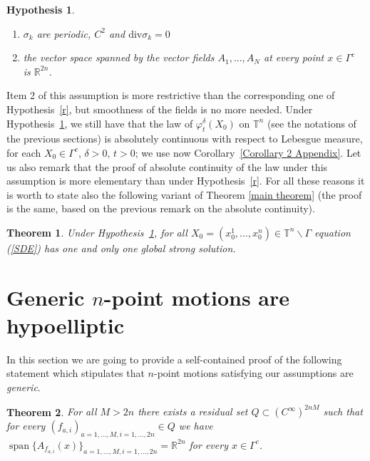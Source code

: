 \documentclass[11pt,a4paper]{article}%
\newtheorem{theorem}{Theorem}
\newtheorem{hypothesis}{Hypothesis}
\begin{document}
\begin{hypothesis}
\label{r 2}
\parbox{0pt}{}
\begin{enumerate}
\item $\sigma_{k}$ are periodic, $C^2$ and
$\mathrm{div}\sigma_{k}=0$

\item the vector space spanned by the vector fields $A_{1},...,A_{N}$ at every
point $x\in\Gamma^{c}$ is $\mathbb{R}^{2n}$.
\end{enumerate}
\end{hypothesis}

Item 2 of this assumption is more restrictive than the corresponding
one of Hypothesis~\ref{r}, but smoothness of the fields is no more
needed. Under
Hypothesis~\ref{r 2}, we still have that the law of $\varphi_{t}^{\delta}%
(X_{0})$ on ${\mathbb{T}}^{n}$ (see the notations of the previous sections) is
absolutely continuous with respect to Lebesgue measure, for each $X_{0}%
\in\Gamma^{c}$, $\delta>0$, $t>0$; we use now Corollary~\ref{Corollary 2 Appendix}. 
Let us also remark that the proof of absolute
continuity of the law under this assumption is more elementary than under
Hypothesis~\ref{r}. For all these reasons it is worth to state also the
following variant of Theorem \ref{main theorem} (the proof is the same, based
on the previous remark on the absolute continuity).

\begin{theorem}
Under Hypothesis~\ref{r 2}, for all $X_{0}=(x_{0}^{1},...,x_{0}^{n}%
)\in{\mathbb{T}}^{n}\backslash\Gamma$ equation (\ref{SDE}) has one and only
one global strong solution.
\end{theorem}

\section{Generic $n$-point motions are hypoelliptic}
\label{sec:generic}

In this section we are going to provide a self-contained proof of the following statement which stipulates that $n$-point motions satisfying our assumptions are \emph{generic}.

\begin{theorem}
\label{th:npoint-genericity}
For all $M > 2 n$ there exists a residual set $Q \subset(C^{\infty})^{2 n M}$
such that  for every $(f_{a, i})_{a = 1, \ldots, M, i = 1, \ldots, 2 n} \in Q$
we have  $\operatorname{span}  \{A_{f_{a, i}} (x)\}_{a = 1, \ldots, M, i = 1,
\ldots, 2 n}  =\mathbb{R}^{2 n}$ for every $x \in\Gamma^{c}$.
\end{theorem}
\end{document}
